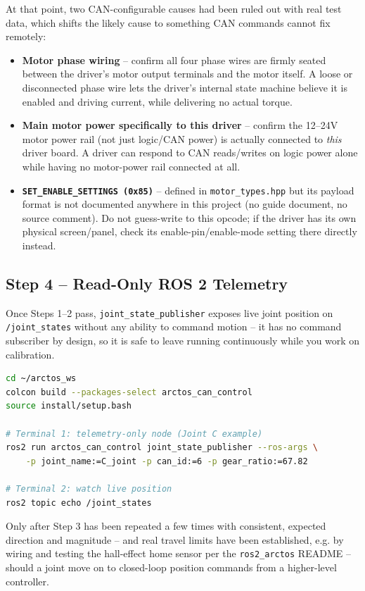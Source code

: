 \documentclass[11pt,letterpaper]{article}
\begin{document}
At that point, two CAN-configurable causes had been ruled out with real test data, which shifts the likely cause to something CAN commands cannot fix remotely:
\begin{itemize}
    \item \textbf{Motor phase wiring} -- confirm all four phase wires are firmly seated between the driver's motor output terminals and the motor itself. A loose or disconnected phase wire lets the driver's internal state machine believe it is enabled and driving current, while delivering no actual torque.
    \item \textbf{Main motor power specifically to this driver} -- confirm the 12--24V motor power rail (not just logic/CAN power) is actually connected to \emph{this} driver board. A driver can respond to CAN reads/writes on logic power alone while having no motor-power rail connected at all.
    \item \textbf{\texttt{SET\_ENABLE\_SETTINGS (0x85)}} -- defined in \texttt{motor\_types.hpp} but its payload format is not documented anywhere in this project (no guide document, no source comment). Do not guess-write to this opcode; if the driver has its own physical screen/panel, check its enable-pin/enable-mode setting there directly instead.
\end{itemize}

\subsection{Step 4 -- Read-Only ROS 2 Telemetry}
Once Steps 1--2 pass, \texttt{joint\_state\_publisher} exposes live joint position on \texttt{/joint\_states} without any ability to command motion -- it has no command subscriber by design, so it is safe to leave running continuously while you work on calibration.

\begin{lstlisting}[language=bash, caption=Joint ROS 2 Telemetry Node]
cd ~/arctos_ws
colcon build --packages-select arctos_can_control
source install/setup.bash

# Terminal 1: telemetry-only node (Joint C example)
ros2 run arctos_can_control joint_state_publisher --ros-args \
    -p joint_name:=C_joint -p can_id:=6 -p gear_ratio:=67.82

# Terminal 2: watch live position
ros2 topic echo /joint_states
\end{lstlisting}

Only after Step 3 has been repeated a few times with consistent, expected direction and magnitude -- and real travel limits have been established, e.g. by wiring and testing the hall-effect home sensor per the \texttt{ros2\_arctos} README -- should a joint move on to closed-loop position commands from a higher-level controller.
\end{document}
